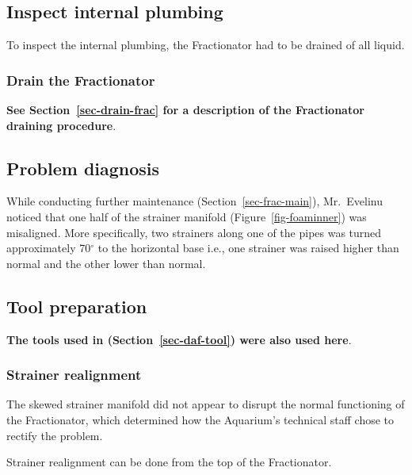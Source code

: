 \documentclass[
  letterpaper,
  DIV=11,
  numbers=noendperiod]{scrreprt}
\begin{document}
\hypertarget{inspect-internal-plumbing-1}{%
\subsection{Inspect internal
plumbing}\label{inspect-internal-plumbing-1}}

To inspect the internal plumbing, the Fractionator had to be drained of
all liquid.

\hypertarget{drain-the-fractionator}{%
\subsubsection{Drain the Fractionator}\label{drain-the-fractionator}}

\textbf{See Section~\ref{sec-drain-frac} for a description of the
Fractionator draining procedure}.

\hypertarget{problem-diagnosis-1}{%
\subsection{Problem diagnosis}\label{problem-diagnosis-1}}

While conducting further maintenance (Section~\ref{sec-frac-main}),
Mr.~Evelinu noticed that one half of the strainer manifold
(Figure~\ref{fig-foaminner}) was misaligned. More specifically, two
strainers along one of the pipes was turned approximately 70\(^\circ\)
to the horizontal base i.e., one strainer was raised higher than normal
and the other lower than normal.

\hypertarget{tool-preparation-2}{%
\subsection{Tool preparation}\label{tool-preparation-2}}

\textbf{The tools used in (Section~\ref{sec-daf-tool}) were also used
here}.

\hypertarget{sec-foam-realign}{%
\subsubsection{Strainer realignment}\label{sec-foam-realign}}

{The skewed strainer manifold did not appear to disrupt the normal
functioning of the Fractionator, which determined how the Aquarium's
technical staff chose to rectify the problem}.

{Strainer realignment can be done from the top of the Fractionator}.
\end{document}

